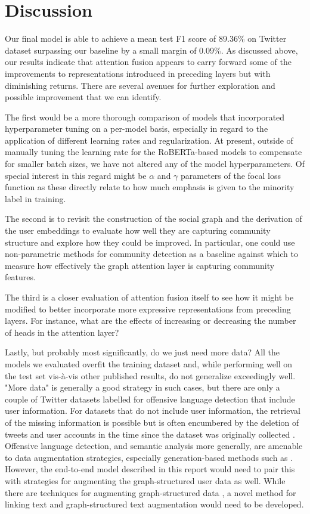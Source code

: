 \documentclass[letterpaper]{article} %
\begin{document}
\section{Discussion}

Our final model is able to achieve a mean test F1 score of 89.36\% on \citet{Miao2022} Twitter dataset surpassing our baseline by a small margin of 0.09\%. As discussed above, our results indicate that attention fusion appears to carry forward some of the improvements to representations introduced in preceding layers but with diminishing returns. There are several avenues for further exploration and possible improvement that we can identify. 

The first would be a more thorough comparison of models that incorporated hyperparameter tuning on a per-model basis, especially in regard to the application of different learning rates and regularization. At present, outside of manually tuning the learning rate for the RoBERTa-based models to compensate for smaller batch sizes, we have not altered any of the model hyperparameters. Of special interest in this regard might be $\alpha$ and $\gamma$ parameters of the focal loss function as these directly relate to how much emphasis is given to the minority label in training. 

The second is to revisit the construction of the social graph and the derivation of the user embeddings to evaluate how well they are capturing community structure and explore how they could be improved. In particular, one could use non-parametric methods for community detection as a baseline against which to measure how effectively the graph attention layer is capturing community features. 

The third is a closer evaluation of attention fusion itself to see how it might be modified to better incorporate more expressive representations from preceding layers. For instance, what are the effects of increasing or decreasing the number of heads in the attention layer?

Lastly, but probably most significantly, do we just need more data? All the models we evaluated overfit the training dataset and, while performing well on the test set vis-\`a-vis other published results, do not generalize exceedingly well. "More data" is generally a good strategy in such cases, but there are only a couple of Twitter datasets labelled for offensive language detection that include user information. For datasets that do not include user information, the retrieval of the missing information is possible but is often encumbered by the deletion of tweets and user accounts in the time since the dataset was originally collected \citep{Mishra2018}. Offensive language detection, and semantic analysis more generally, are amenable to data augmentation strategies, especially generation-based methods such as \citet{liu2020}. However, the end-to-end model described in this report would need to pair this with strategies for augmenting the graph-structured user data as well. While there are techniques for augmenting graph-structured data \citep{zhao2022}, a novel method for linking text and graph-structured text augmentation would need to be developed.

\appendix


\end{document}
